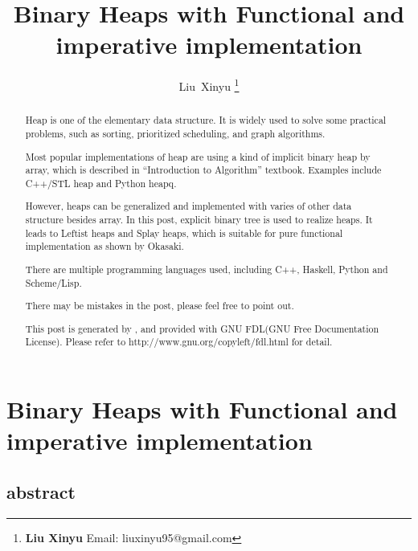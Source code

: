 \documentclass{article}
\begin{document}
\fi


\title{Binary Heaps with Functional and imperative implementation}

\author{Liu~Xinyu
\thanks{{\bfseries Liu Xinyu } \newline
  Email: liuxinyu95@gmail.com \newline}
  }


\maketitle

\ifx\wholebook\relax
\chapter{Binary Heaps with Functional and imperative implementation}

\section{abstract}
\else
\begin{abstract}
\fi
Heap is one of the elementary data structure. It is widely used
to solve some practical problems, such as sorting, prioritized
scheduling, and graph algorithms\cite{wiki-heap}. 

Most popular implementations of heap are using a kind of implicit
binary heap by array, which is described in ``Introduction to 
Algorithm'' textbook\cite{CLRS}. Examples include C++/STL
heap and Python heapq.

However, heaps can be generalized and implemented with varies
of other data structure besides array. In this post, explicit
binary tree is used to realize heaps. It leads to Leftist heaps
and Splay heaps, which is suitable for pure functional implementation as shown
by Okasaki\cite{okasaki-book}.

There are multiple programming languages used, including
C++, Haskell, Python and Scheme/Lisp.

There may be mistakes in the post, please feel free to point out.

This post is generated by \LaTeXe, and provided with GNU FDL(GNU Free Documentation License).
Please refer to http://www.gnu.org/copyleft/fdl.html for detail.

\ifx\wholebook\relax \else
\end{abstract}
\fi
\end{document}
